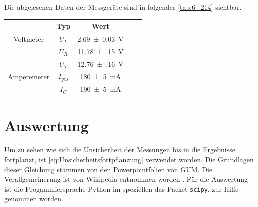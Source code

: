 \documentclass[11pt,ngerman]{scrartcl}
\begin{document}
Die abgelesenen Daten der Messgeräte sind in folgender \autoref{tab:6_214} sichtbar.

\begin{table}[H]
	\begin{center}
		\begin{tabular}{|c|c|c|c|c|} \hline
			{}          & \textbf{Typ} & \textbf{Wert}      \\ \hline
			Voltmeter   & $U_{L}$      & \SI{2.69(3)}{\V}   \\
			            & $U_{R}$      & \SI{11.78(15)}{\V} \\
			            & $U_{T}$      & \SI{12.76(16)}{\V} \\ \hline
			Amperemeter & $I_{ges}$    & \SI{180(5)}{\mA}   \\
			            & $I_{C}$      & \SI{190(5)}{\mA}   \\ \hline
		\end{tabular}
		\label{tab:6_214}
	\end{center}
\end{table}




\newpage


\section{Auswertung}

\noindent Um zu sehen wie sich die Unsicherheit der Messungen bis in die Ergebnisse
fortplanzt, ist \autoref{eq:Unsicherheitsfortpflanzung} verwendet worden.
Die Grundlagen dieser Gleichung stammen von den Powerpointfolien von
GUM.\cite{WolfgangKessel2004} Die Verallgemeinerung ist von Wikipedia entnommen
worden \cite{2020Fehler}.
Für die Auswertung ist die Progammiersprache Python im speziellen das
Packet \verb#scipy#, zur Hilfe genommen worden.
\end{document}
